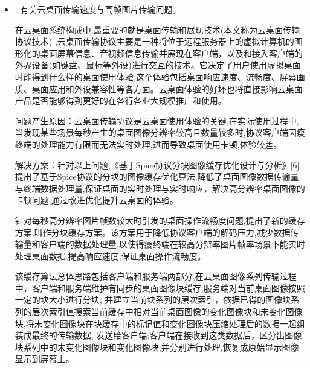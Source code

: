 \documentclass{article}
\begin{document}
\begin{itemize}
  
    \item	有关云桌面传输速度与高帧图片传输问题。\par
    在云桌面系统构成中,最重要的就是桌面传输和展现技术(本文称为云桌面传输协议技术) ,云桌面传输协议主要是一种将位于远程服务器上的虚拟计算机的图形化的桌面屏幕信息、音视频信息传输并展现在客户端，以及和接入客户端的外界设备(如键盘、鼠标等外设)进行交互的技术。它决定了用户使用虚拟桌面时能得到什么样的桌面使用体验,这个体验包括桌面响应速度、流畅度、屏幕画质、桌面应用和外设兼容性等各方面。云桌面体验的好坏也将直接影响云桌面产品是否能够得到更好的在各行各业大规模推广和使用。\par
    问题产生原因：云桌面传输协议是云桌面使用体验的关键,在实际使用过程中,当发现某些场景每秒产生的桌面图像分辨率较高且数量较多时,协议客户端因瘦终端的处理能力有限而无法实时处理,进而导致桌面使用卡顿,体验较差。\par
    解决方案：针对以上问题,《基于Spice协议分块图像缓存优化设计与分析》[6]提出了基于Spice协议的分块的图像缓存优化算法,降低了桌面图像数据传输量与终端数据处理量,保证桌面的实时处理与实时响应，解决高分辨率桌面图像的卡顿问题,通过改进优化提升云桌面的体验。\par
    针对每秒高分辨率图片帧数较大时引发的桌面操作流畅度问题,提出了新的缓存方案,叫作分块缓存方案。该方案用于降低协议客户端的解码压力,减少数据传输量和客户端的数据处理量,以使得瘦终端在较高分辨率图片帧率场景下能实时处理桌面数据,提高响应速度,保证桌面操作流畅度。\par
    该缓存算法总体思路包括客户端和服务端两部分,在云桌面图像系列传输过程中，客户端和服务端维护有同步的桌面图像块缓存,服务端对当前桌面图像按照一定的块大小进行分块, 并建立当前块系列的层次索引，依据已得的图像块系列的层次索引值搜索当前缓存中相对当前桌面图像的变化图像块和未变化图像块,将未变化图像块在块缓存中的标记值和变化图像块压缩处理后的数据一起组装成最终的传输数据, 发送给客户端;客户端在接收到这类数据后，区分出图像块系列中的未变化图像块和变化图像块,并分别进行处理,恢复成原始显示图像显示到屏幕上。\par
    

\end{itemize}
\end{document}
